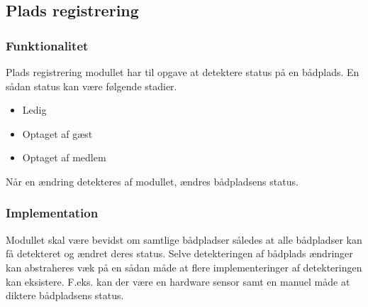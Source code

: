 \subsection{Plads registrering}
\label{sub:plads_registrering}

\subsubsection{Funktionalitet}
\label{ssub:Funktionalitet}

Plads registrering modullet har til opgave at detektere status på en bådplads. En sådan status kan være følgende stadier.

\begin{itemize}
  \item Ledig
  \item Optaget af gæst
  \item Optaget af medlem
\end{itemize}

Når en ændring detekteres af modullet, ændres bådpladsens status. 

\subsubsection{Implementation}
\label{ssub:plads_implementation}

Modullet skal være bevidst om samtlige bådpladser således at alle bådpladser kan få detekteret og ændret deres status. Selve detekteringen af bådplads ændringer kan abstraheres væk på en sådan måde at flere implementeringer af detekteringen kan eksistere. F.eks. kan der være en hardware sensor samt en manuel måde at diktere bådpladsens status.
